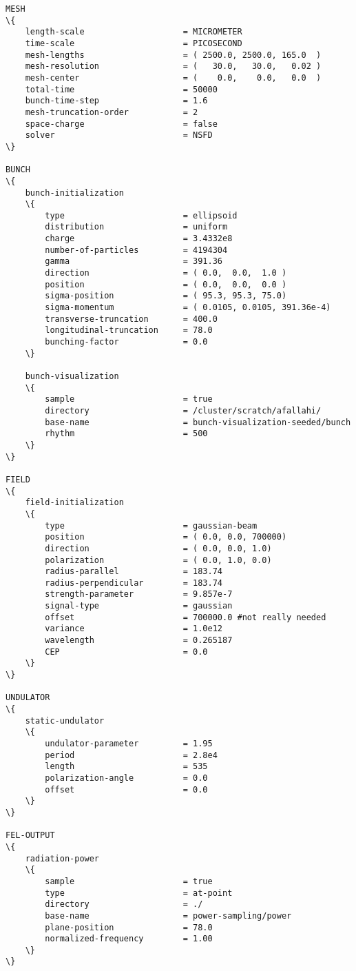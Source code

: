 \begin{appendices}
\begin{snugshade}
\begin{Verbatim}[fontsize=\footnotesize, tabsize=4, fontfamily=courier, fontseries=b, commandchars=\\\{\}, obeytabs]
MESH
\{
	length-scale					= MICROMETER
	time-scale						= PICOSECOND
	mesh-lengths 					= ( 2500.0, 2500.0, 165.0  )
	mesh-resolution 				= (   30.0,   30.0,   0.02 )
	mesh-center 					= (    0.0,    0.0,   0.0  )
	total-time 						= 50000
	bunch-time-step 				= 1.6
	mesh-truncation-order 			= 2
 	space-charge 					= false
	solver							= NSFD
\}

BUNCH
\{
	bunch-initialization
	\{
		type						= ellipsoid
		distribution				= uniform
		charge						= 3.4332e8
		number-of-particles			= 4194304
		gamma						= 391.36
		direction					= ( 0.0,  0.0,  1.0 )
		position					= ( 0.0,  0.0,  0.0 )
		sigma-position				= ( 95.3, 95.3, 75.0)
		sigma-momentum				= ( 0.0105, 0.0105, 391.36e-4)
		transverse-truncation		= 400.0
		longitudinal-truncation		= 78.0
		bunching-factor				= 0.0
	\}

	bunch-visualization
	\{
		sample						= true
		directory					= /cluster/scratch/afallahi/
		base-name					= bunch-visualization-seeded/bunch
		rhythm						= 500
	\}
\}

FIELD
\{
	field-initialization
	\{
		type						= gaussian-beam
		position					= ( 0.0, 0.0, 700000)
		direction					= ( 0.0, 0.0, 1.0)
		polarization				= ( 0.0, 1.0, 0.0)
		radius-parallel				= 183.74
		radius-perpendicular		= 183.74
		strength-parameter			= 9.857e-7
		signal-type					= gaussian
		offset						= 700000.0 #not really needed
		variance					= 1.0e12
		wavelength					= 0.265187
		CEP							= 0.0
	\}
\}

UNDULATOR
\{
	static-undulator
	\{
		undulator-parameter			= 1.95
		period						= 2.8e4
		length						= 535
		polarization-angle			= 0.0
		offset						= 0.0
	\}
\}

FEL-OUTPUT
\{
	radiation-power
	\{
		sample						= true
		type						= at-point
		directory					= ./
		base-name					= power-sampling/power
		plane-position				= 78.0
		normalized-frequency		= 1.00
	\}
\}
\end{Verbatim}
\end{snugshade}

\end{appendices}